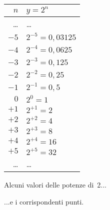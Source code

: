 \begin{figure}[h]
 \centering
 \begin{minipage}[]{.48\textwidth}
 \vspace*{1cm}
  \begin{center}
   \begin{tabular}{r|l}
    $n$   & $y=2^n$ \\
    \hline
    \dots & \dots \\
    $-5$ & $2^{-5} = 0,03125$ \\
    $-4$ & $2^{-4} = 0,0625$ \\
    $-3$ & $2^{-3} = 0,125$ \\
    $-2$ & $2^{-2} = 0,25$ \\
    $-1$ & $2^{-1} = 0,5$ \\
    $0$ & $2^{0} = 1$ \\
    $+1$ & $2^{+1} = 2$ \\
    $+2$ & $2^{+2} = 4$ \\
    $+3$ & $2^{+3} = 8$ \\
    $+4$ & $2^{+4} = 16$ \\
    $+5$ & $2^{+5} = 32$ \\
    \dots & \dots \\
   \end{tabular}
 \vspace*{1.8cm}
  \caption{Alcuni valori delle potenze di~2...} \label{tab:potdue0}
  \end{center}
 \end{minipage}
\begin{minipage}[]{.48\textwidth}
\begin{center}
\begin{inaccessibleblock}
  \puntia
  \caption{...e i corrispondenti punti.} \label{fig:potdue0}
\end{inaccessibleblock}
\end{center}
\end{minipage}
\end{figure}

